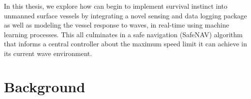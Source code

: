 In this thesis, we explore how can begin to implement survival instinct into unmanned surface vessels by integrating a novel sensing and data logging package as well as modeling the vessel response to waves, in real-time using machine learning processes.
This all culminates in a safe navigation (SafeNAV) algorithm that informs a central controller about the maximum speed limit it can achieve in its current wave environment.

\section{Background}


